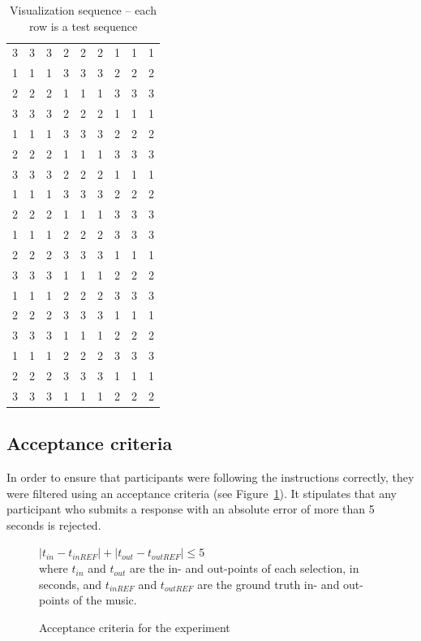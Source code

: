 \begin{table}
{\begin{tabular}{rrrrrrrrr}
      3 & 3 & 3 & 2 & 2 & 2 & 1 & 1 & 1 \\ 
      1 & 1 & 1 & 3 & 3 & 3 & 2 & 2 & 2 \\ 
      2 & 2 & 2 & 1 & 1 & 1 & 3 & 3 & 3 \\ 
      3 & 3 & 3 & 2 & 2 & 2 & 1 & 1 & 1 \\ 
      1 & 1 & 1 & 3 & 3 & 3 & 2 & 2 & 2 \\ 
      2 & 2 & 2 & 1 & 1 & 1 & 3 & 3 & 3 \\ 
      3 & 3 & 3 & 2 & 2 & 2 & 1 & 1 & 1 \\ 
      1 & 1 & 1 & 3 & 3 & 3 & 2 & 2 & 2 \\ 
      2 & 2 & 2 & 1 & 1 & 1 & 3 & 3 & 3 \\ 
      1 & 1 & 1 & 2 & 2 & 2 & 3 & 3 & 3 \\ 
      2 & 2 & 2 & 3 & 3 & 3 & 1 & 1 & 1 \\ 
      3 & 3 & 3 & 1 & 1 & 1 & 2 & 2 & 2 \\ 
      1 & 1 & 1 & 2 & 2 & 2 & 3 & 3 & 3 \\ 
      2 & 2 & 2 & 3 & 3 & 3 & 1 & 1 & 1 \\ 
      3 & 3 & 3 & 1 & 1 & 1 & 2 & 2 & 2 \\ 
      1 & 1 & 1 & 2 & 2 & 2 & 3 & 3 & 3 \\ 
      2 & 2 & 2 & 3 & 3 & 3 & 1 & 1 & 1 \\ 
      3 & 3 & 3 & 1 & 1 & 1 & 2 & 2 & 2 \\ 
    \end{tabular}
    \caption{Visualization sequence -- each row is a test sequence}
    \label{tab:visseq}
  }
\end{table}

\subsection{Acceptance criteria}\label{sec:study1-acceptance}
In order to ensure that participants were following the instructions correctly, they were filtered using an acceptance
criteria (see Figure~\ref{eq:accept}).  It stipulates that any participant who submits a response with an absolute
error of more than 5 seconds is rejected.

\begin{figure}[ht]
  \begin{center}
    $ |t_{in}-t_{inREF}| + |t_{out}-t_{outREF}| \leq 5 $\\[1em]
    where $t_{in}$ and $t_{out}$ are the in- and out-points of each selection, in seconds,
    and $t_{inREF}$ and $t_{outREF}$ are the ground truth in- and out-points of the music.
  \end{center}
  \caption{Acceptance criteria for the experiment}
  \label{eq:accept}
\end{figure}

